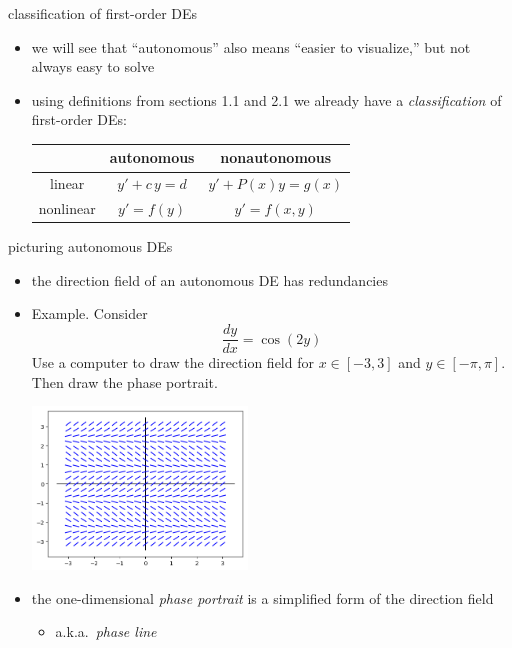 \documentclass[colorlinks]{beamer}
\begin{document}
\begin{frame}{classification of first-order DEs}

\begin{itemize}
\item we will see that ``autonomous'' also means ``easier to visualize,'' but not always easy to solve
\item using definitions from sections 1.1 and 2.1 we already have a \emph{classification} of first-order DEs:

\medskip
\begin{center}
\begin{tabular}{c|c|c}
 & autonomous & nonautonomous \\ \hline
linear \Large\strut & $y' + c\, y = d$ & $y' + P(x) y = g(x)$ \\ \hline
nonlinear \Large\strut & $y' = f(y)$ & $y'=f(x,y)$
\end{tabular}
\end{center}
\end{itemize}
\end{frame}


\begin{frame}{picturing autonomous DEs}

\begin{itemize}
\item the direction field of an autonomous DE has redundancies

\medskip
\item \begin{minipage}[t]{0.35\textwidth} \small
Example.  Consider
$$\frac{dy}{dx} = \cos(2y)$$
Use a computer to draw the direction field for $x \in [-3,3]$ and $y\in [-\pi,\pi]$.  Then draw the phase portrait.
\end{minipage}

\vspace{-35mm}
\hfill \includegraphics[width=0.45\textwidth]{figs/autonomous-cos} \phantom{ldkjaf}

\bigskip
\item the one-dimensional \emph{phase portrait} is a simplified form of the direction field
    \begin{itemize}
    \item a.k.a.~\emph{phase line}
    \end{itemize}

\end{itemize}
\end{frame}
\end{document}
